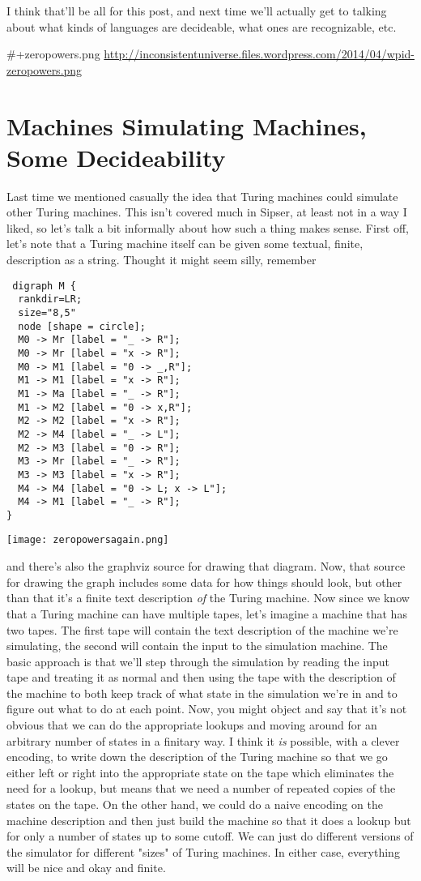 \documentclass[11pt]{article}
\begin{document}
I think that'll be all for this post, and next time we'll actually get to talking about what kinds of languages are decideable, what ones are recognizable, etc.

\#+zeropowers.png \url{http://inconsistentuniverse.files.wordpress.com/2014/04/wpid-zeropowers.png}
\section{Machines Simulating Machines, Some Decideability}
\label{sec-12}
Last time we mentioned casually the idea that Turing machines could simulate other Turing machines. This isn't covered much in Sipser, at least not in a way I liked, so let's talk a bit informally about how such a thing makes sense. First off, let's note that a Turing machine itself can be given some textual, finite, description as a string. Thought it might seem silly, remember 

\begin{verbatim}
 digraph M {
  rankdir=LR;
  size="8,5"
  node [shape = circle];
  M0 -> Mr [label = "_ -> R"];
  M0 -> Mr [label = "x -> R"];
  M0 -> M1 [label = "0 -> _,R"];
  M1 -> M1 [label = "x -> R"];
  M1 -> Ma [label = "_ -> R"];
  M1 -> M2 [label = "0 -> x,R"];
  M2 -> M2 [label = "x -> R"];
  M2 -> M4 [label = "_ -> L"];
  M2 -> M3 [label = "0 -> R"];
  M3 -> Mr [label = "_ -> R"];
  M3 -> M3 [label = "x -> R"];
  M4 -> M4 [label = "0 -> L; x -> L"];
  M4 -> M1 [label = "_ -> R"];
}
\end{verbatim}

\texttt{[image: zeropowersagain.png]}

and there's also the graphviz source for drawing that diagram. Now, that source for drawing the graph includes some data for how things should look, but other than that it's a finite text description \emph{of} the Turing machine. Now since we know that a Turing machine can have multiple tapes, let's imagine a machine that has two tapes. The first tape will contain the text description of the machine we're simulating, the second will contain the input to the simulation machine. The basic approach is that we'll step through the simulation by reading the input tape and treating it as normal and then using the tape with the description of the machine to both keep track of what state in the simulation we're in and to figure out what to do at each point. Now, you might object and say that it's not obvious that we can do the appropriate lookups and moving around for an arbitrary number of states in a finitary way. I think it \emph{is} possible, with a clever encoding, to write down the description of the Turing machine so that we go either left or right into the appropriate state on the tape which eliminates the need for a lookup, but means that we need a number of repeated copies of the states on the tape. On the other hand, we could do a naive encoding on the machine description and then just build the machine so that it does a lookup but for only a number of states up to some cutoff. We can just do different versions of the simulator for different "sizes" of Turing machines. In either case, everything will be nice and okay and finite.
\end{document}
